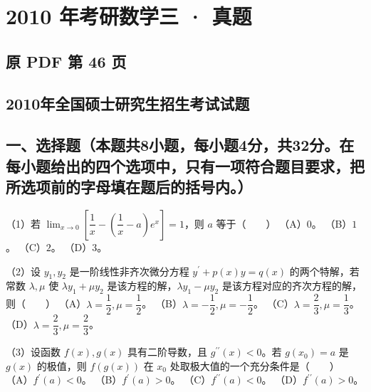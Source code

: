 \documentclass[UTF8,12pt]{ctexart}
\begin{document}
\section*{2010 年考研数学三 · 真题}
\subsection*{原 PDF 第 46 页}

\subsection*{2010年全国硕士研究生招生考试试题}

\subsection*{一、选择题（本题共8小题，每小题4分，共32分。在每小题给出的四个选项中，只有一项符合题目要求，把所选项前的字母填在题后的括号内。）}

（1）若 \(\displaystyle \lim_{x\to0}\left[\dfrac{\displaystyle 1}{\displaystyle x}-\left(\dfrac{\displaystyle 1}{\displaystyle x}-a\right)e^x\right]=1\)，则 \(\displaystyle a\) 等于（　　）
（A）\(\displaystyle 0\)。 （B）\(\displaystyle 1\)。 （C）\(\displaystyle 2\)。 （D）\(\displaystyle 3\)。


（2）设 \(\displaystyle y_1,\allowbreak y_2\) 是一阶线性非齐次微分方程 \(\displaystyle y^{\prime}+p(x)y=q(x)\) 的两个特解，若常数 \(\displaystyle \lambda,\allowbreak \mu\) 使 \(\displaystyle \lambda y_1+\mu y_2\) 是该方程的解，\(\displaystyle \lambda y_1-\mu y_2\) 是该方程对应的齐次方程的解，则（　　）
（A）\(\displaystyle \lambda=\dfrac{\displaystyle 1}{\displaystyle 2},\allowbreak \mu=\dfrac{\displaystyle 1}{\displaystyle 2}\)。 （B）\(\displaystyle \lambda=-\dfrac{\displaystyle 1}{\displaystyle 2},\allowbreak \mu=-\dfrac{\displaystyle 1}{\displaystyle 2}\)。 （C）\(\displaystyle \lambda=\dfrac{\displaystyle 2}{\displaystyle 3},\allowbreak \mu=\dfrac{\displaystyle 1}{\displaystyle 3}\)。 （D）\(\displaystyle \lambda=\dfrac{\displaystyle 2}{\displaystyle 3},\allowbreak \mu=\dfrac{\displaystyle 2}{\displaystyle 3}\)。


（3）设函数 \(\displaystyle f(x),\allowbreak g(x)\) 具有二阶导数，且 \(\displaystyle g^{\prime\prime}(x)<0\)。若 \(\displaystyle g(x_0)=a\) 是 \(\displaystyle g(x)\) 的极值，则 \(\displaystyle f(g(x))\) 在 \(\displaystyle x_0\) 处取极大值的一个充分条件是（　　）
（A）\(\displaystyle f^{\prime}(a)<0\)。 （B）\(\displaystyle f^{\prime}(a)>0\)。 （C）\(\displaystyle f^{\prime\prime}(a)<0\)。 （D）\(\displaystyle f^{\prime\prime}(a)>0\)。
\end{document}
